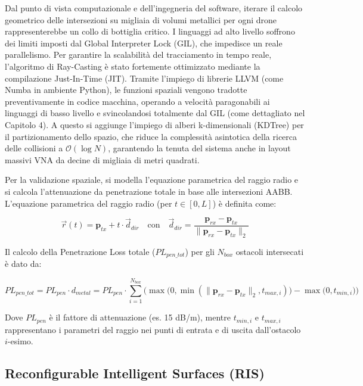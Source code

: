 \documentclass[twoside]{article}
\begin{document}
Dal punto di vista computazionale e dell'ingegneria del software, iterare il calcolo geometrico delle intersezioni su migliaia di volumi metallici per ogni drone rappresenterebbe un collo di bottiglia critico. I linguaggi ad alto livello soffrono dei limiti imposti dal Global Interpreter Lock (GIL), che impedisce un reale parallelismo. Per garantire la scalabilità del tracciamento in tempo reale, l'algoritmo di Ray-Casting è stato fortemente ottimizzato mediante la compilazione Just-In-Time (JIT). Tramite l'impiego di librerie LLVM (come Numba in ambiente Python), le funzioni spaziali vengono tradotte preventivamente in codice macchina, operando a velocità paragonabili ai linguaggi di basso livello e svincolandosi totalmente dal GIL (come dettagliato nel Capitolo 4). A questo si aggiunge l'impiego di alberi k-dimensionali (KDTree) per il partizionamento dello spazio, che riduce la complessità asintotica della ricerca delle collisioni a $\mathcal{O}(\log N)$, garantendo la tenuta del sistema anche in layout massivi VNA da decine di migliaia di metri quadrati.

Per la validazione spaziale, si modella l'equazione parametrica del raggio radio e si calcola l'attenuazione da penetrazione totale in base alle intersezioni AABB. L'equazione parametrica del raggio radio (per $t \in [0, L]$) è definita come:

\begin{equation}
\vec{r}(t) = \mathbf{p}_{tx} + t \cdot \vec{d}_{dir} \quad \text{con} \quad \vec{d}_{dir} = \frac{\mathbf{p}_{rx} - \mathbf{p}_{tx}}{\|\mathbf{p}_{rx} - \mathbf{p}_{tx}\|_2} \label{eq:ray_parametric}
\end{equation}

Il calcolo della Penetrazione Loss totale ($PL_{pen\_tot}$) per gli $N_{box}$ ostacoli intersecati è dato da:

\begin{equation}
PL_{pen\_tot} = PL_{pen} \cdot d_{metal} = PL_{pen} \cdot \sum_{i=1}^{N_{box}} \Big( \max\big(0, \min(\|\mathbf{p}_{rx}-\mathbf{p}_{tx}\|_2, t_{max,i})\big) - \max\big(0, t_{min,i}\big) \Big) \label{eq:pl_pen_tot}
\end{equation}

Dove $PL_{pen}$ è il fattore di attenuazione (es. 15 dB/m), mentre $t_{min,i}$ e $t_{max,i}$ rappresentano i parametri del raggio nei punti di entrata e di uscita dall'ostacolo $i$-esimo.
\subsection{Reconfigurable Intelligent Surfaces (RIS)}
\end{document}

